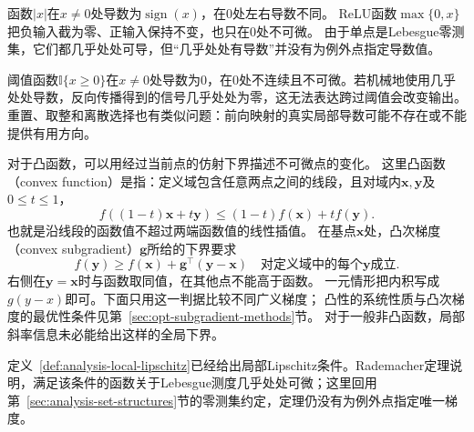 函数$|x|$在$x\neq0$处导数为$\operatorname{sign}(x)$，在$0$处左右导数不同。
ReLU函数$\max\{0,x\}$把负输入截为零、正输入保持不变，也只在$0$处不可微。
由于单点是Lebesgue零测集，它们都几乎处处可导，但“几乎处处有导数”并没有为例外点指定导数值。

阈值函数$\mathbb{I}\{x\geq0\}$在$x\neq0$处导数为$0$，在$0$处不连续且不可微。若机械地使用几乎处处导数，反向传播得到的信号几乎处处为零，这无法表达跨过阈值会改变输出。重置、取整和离散选择也有类似问题：前向映射的真实局部导数可能不存在或不能提供有用方向。

对于凸函数，可以用经过当前点的仿射下界描述不可微点的变化。
这里凸函数（convex function）是指：定义域包含任意两点之间的线段，且对域内$\bm x,\bm y$及$0\leq t\leq1$，
\[
 f((1-t)\bm x+t\bm y)\leq(1-t)f(\bm x)+tf(\bm y).
\]
也就是沿线段的函数值不超过两端函数值的线性插值。
在基点$\bm x$处，凸次梯度（convex subgradient）$\bm g$所给的下界要求
\[
 f(\bm y)\geq f(\bm x)+\bm g^\top(\bm y-\bm x)
 \quad\text{对定义域中的每个$\bm y$成立}.
\]
右侧在$\bm y=\bm x$时与函数取同值，在其他点不能高于函数。
一元情形把内积写成$g(y-x)$即可。下面只用这一判据比较不同广义梯度；
凸性的系统性质与凸次梯度的最优性条件见第~\ref{sec:opt-subgradient-methods}节。
对于一般非凸函数，局部斜率信息未必能给出这样的全局下界。

定义~\ref{def:analysis-local-lipschitz}已经给出局部Lipschitz条件。Rademacher定理说明，满足该条件的函数关于Lebesgue测度几乎处处可微；这里回用第~\ref{sec:analysis-set-structures}节的零测集约定，定理仍没有为例外点指定唯一梯度。

